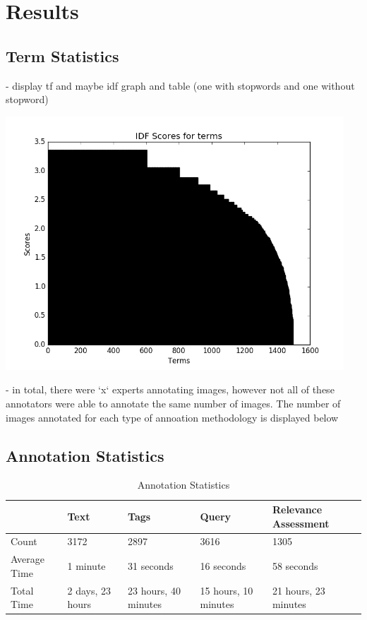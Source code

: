 \chapter{Results}

\section{Term Statistics}

- display tf and maybe idf graph and table (one with stopwords and one without stopword)

\includegraphics[width=0.95\textwidth]{graphs/idf}

- in total, there were `x` experts annotating images, however not all of these annotators were able to annotate the same number of images. The number of images annotated for each type of annoation methodology is displayed below


\section{Annotation Statistics}

\begin{table}[htb]
    \centering
    \begin{adjustbox}{center}
    \begin{tabular}{ | l | l | l | l | p{5cm} |}
    \hline
    & Text & Tags & Query & Relevance Assessment \\ \hline
    Count & 3172 & 2897 & 3616 & 1305 \\ \hline
    Average Time & 1 minute & 31 seconds & 16 seconds & 58 seconds \\ \hline
    Total Time & 2 days, 23 hours & 23 hours, 40 minutes & 15 hours, 10 minutes & 21 hours, 23 minutes \\ \hline
    \end{tabular}
    \end{adjustbox}
    \caption{Annotation Statistics}
\end{table}

